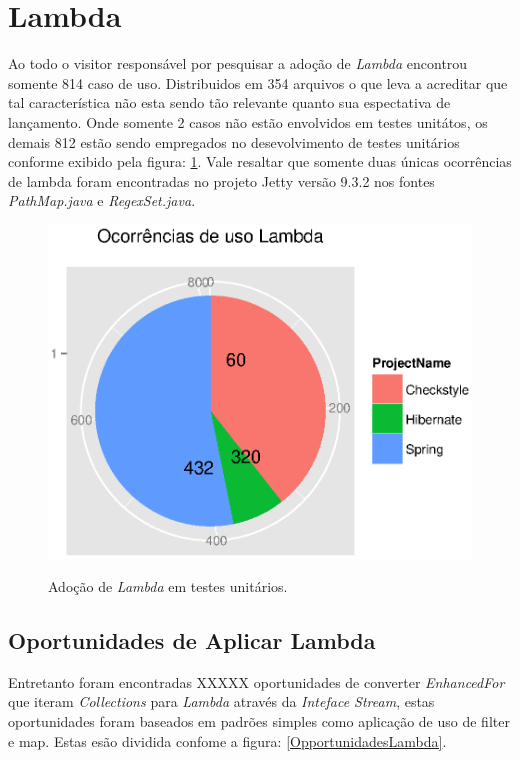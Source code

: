 \section{Lambda}
Ao todo o visitor responsável por pesquisar a adoção de \textit{Lambda} encontrou somente 814 caso de uso. Distribuidos em 354 arquivos o que leva a acreditar que tal característica não esta sendo tão relevante quanto sua espectativa de lançamento. Onde somente 2 casos não estão envolvidos em testes unitátos, os demais 812 estão sendo empregados no desevolvimento de testes unitários conforme exibido pela figura: \ref{fig:AdocaoLambda}. Vale resaltar que somente duas únicas ocorrências de lambda foram encontradas no projeto Jetty versão 9.3.2 nos fontes \textit{PathMap.java} e \textit{RegexSet.java}.\\

\begin{figure}[h]
	\center
	\includegraphics[scale=0.5]{Imagens/AdocaoLambdaTestes}
	\label{fig:AdocaoLambda}
	\caption{Adoção de \textit{Lambda} em testes unitários.}
\end{figure}



\subsection{Oportunidades de Aplicar Lambda}
Entretanto foram encontradas XXXXX oportunidades de converter \textit{EnhancedFor} que iteram \textit{Collections} para \textit{Lambda} através da \textit{Inteface Stream}, estas oportunidades foram baseados em padrões simples como aplicação de uso de filter e map. Estas esão dividida confome a figura: \ref{OpportunidadesLambda}.\\
